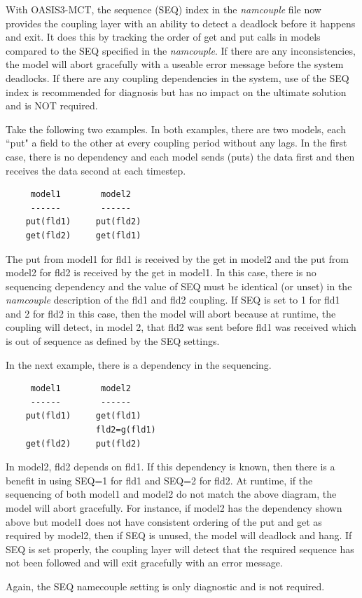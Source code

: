 With OASIS3-MCT, the sequence (SEQ) index in the {\it namcouple} file now provides the coupling 
layer with an ability to detect a deadlock before it happens and exit. 
It does this by tracking the order of get and put calls in
models compared to the SEQ specified in the {\it namcouple}.  If there are any
inconsistencies, the model will abort gracefully with a useable error
message before the system deadlocks.  If there are any coupling dependencies
in the system, use of the SEQ index is recommended for diagnosis but
has no impact on the ultimate solution and is NOT required.

Take the following two examples.  In both examples, there are two
models, each ``put" a field to the other at every coupling period
without any lags.  In the first case, there is no dependency and 
each model sends (puts) the data first and then receives the data
second at each timestep.

\begin{verbatim}
     model1        model2
     ------        ------
    put(fld1)     put(fld2)
    get(fld2)     get(fld1)
\end{verbatim}

The put from model1 for fld1 is received by the get in model2 and the
put from model2 for fld2 is received by the get in model1.  In this case,
there is no sequencing dependency and the value of SEQ must be
identical (or unset) in the {\it namcouple} description of the fld1
and fld2 coupling.  If SEQ is set to 1 for fld1 and 2 for fld2 in this case, then
the model will abort because at runtime, the coupling will detect, in model 2, that 
fld2 was sent before fld1 was received which is out of sequence
as defined by the SEQ settings.

In the next example, there is a dependency in the sequencing.

\begin{verbatim}
     model1        model2
     ------        ------
    put(fld1)     get(fld1)
                  fld2=g(fld1)
    get(fld2)     put(fld2)
\end{verbatim}

In model2, fld2 depends on fld1.  If this dependency is known, then
there is a benefit in using SEQ=1 for fld1 and SEQ=2 for fld2.  At
runtime, if the sequencing of both model1 and model2 do not match
the above diagram, the model will abort gracefully.  For instance,
if model2 has the dependency shown above but model1 does not have
consistent ordering of the put and get as required by model2,
then if SEQ is unused, the model will deadlock and hang.  If SEQ
is set properly, the coupling layer will detect that the required
sequence has not been followed and will exit gracefully with an
error message.  

Again, the SEQ namecouple setting is only diagnostic and is
not required.



